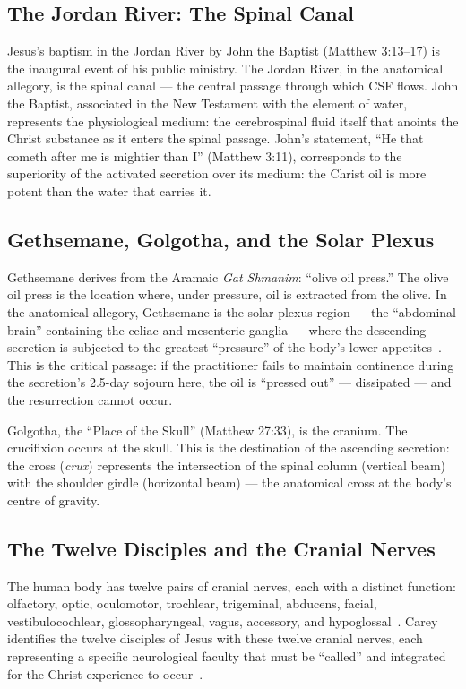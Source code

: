 \documentclass[12pt, a4paper]{article}
\begin{document}
\subsection{The Jordan River: The Spinal Canal}

Jesus's baptism in the Jordan River by John the Baptist (Matthew 3:13--17) is
the inaugural event of his public ministry. The Jordan River, in the
anatomical allegory, is the spinal canal — the central passage through which
CSF flows. John the Baptist, associated in the New Testament with the element
of water, represents the physiological medium: the cerebrospinal fluid itself
that anoints the Christ substance as it enters the spinal passage. John's
statement, ``He that cometh after me is mightier than I'' (Matthew 3:11),
corresponds to the superiority of the activated secretion over its medium:
the Christ oil is more potent than the water that carries it.

\subsection{Gethsemane, Golgotha, and the Solar Plexus}

Gethsemane derives from the Aramaic \emph{Gat Shmanim}: ``olive oil press.''
The olive oil press is the location where, under pressure, oil is extracted
from the olive. In the anatomical allegory, Gethsemane is the solar plexus
region — the ``abdominal brain'' containing the celiac and mesenteric ganglia
— where the descending secretion is subjected to the greatest ``pressure'' of
the body's lower appetites~\autocite[83]{carey1920}. This is the critical
passage: if the practitioner fails to maintain continence during the
secretion's 2.5-day sojourn here, the oil is ``pressed out'' — dissipated —
and the resurrection cannot occur.

Golgotha, the ``Place of the Skull'' (Matthew 27:33), is the cranium. The
crucifixion occurs at the skull. This is the destination of the ascending
secretion: the cross (\emph{crux}) represents the intersection of the spinal
column (vertical beam) with the shoulder girdle (horizontal beam) — the
anatomical cross at the body's centre of gravity.

\subsection{The Twelve Disciples and the Cranial Nerves}

The human body has twelve pairs of cranial nerves, each with a distinct
function: olfactory, optic, oculomotor, trochlear, trigeminal, abducens,
facial, vestibulocochlear, glossopharyngeal, vagus, accessory, and
hypoglossal~\autocite[878]{gray2016}. Carey identifies the twelve disciples of
Jesus with these twelve cranial nerves, each representing a specific
neurological faculty that must be ``called'' and integrated for the Christ
experience to occur~\autocite[91]{carey1920}.
\end{document}
